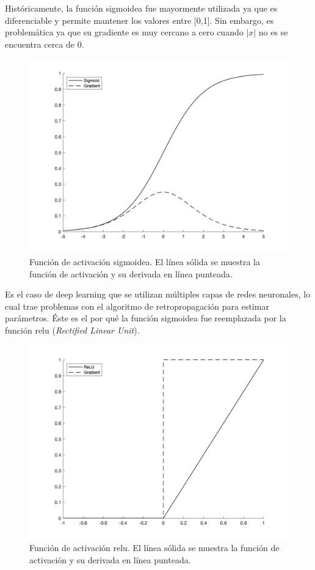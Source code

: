 \indent Históricamente, la función sigmoidea fue mayormente utilizada ya que es diferenciable y permite mantener los valores entre [0,1]. Sin embargo, es problemática ya que su gradiente es muy cercano a cero cuando $|x|$ no es se encuentra cerca de 0. 

\begin{figure}[H]
    \centering
    \includegraphics[scale=0.3]{sections/chapter-06/images/sigmoid.png}
    \caption[Función de activación sigmoidea.]{Función de activación sigmoidea. El línea sólida se muestra la función de activación y su derivada en línea punteada.}
    \label{fig:relu}
\end{figure}

\indent Es el caso de deep learning que se utilizan múltiples capas de redes neuronales, lo cual trae problemas con el algoritmo de retropropagación para estimar parámetros. Éste es el por qué la función sigmoidea fue reemplazada por la función \acrshort{relu} (\textit{Rectified Linear Unit}). 

\begin{figure}[H]
    \centering
    \includegraphics[scale=0.3]{sections/chapter-06/images/ReLU.png}
    \caption[Función de activación \acrshort{relu}.]{Función de activación \acrshort{relu}. El línea sólida se muestra la función de activación y su derivada en línea punteada.}
    \label{fig:sigmoid}
\end{figure}

